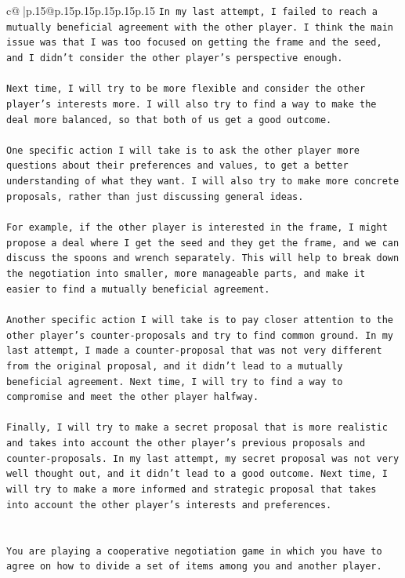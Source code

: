 \documentclass{article}
\begin{document}
{\begin{supertabular}{c@{$\;$}|p{.15\linewidth}@{}p{.15\linewidth}p{.15\linewidth}p{.15\linewidth}p{.15\linewidth}p{.15\linewidth}}
{{{\texttt{In my last attempt, I failed to reach a mutually beneficial agreement with the other player. I think the main issue was that I was too focused on getting the frame and the seed, and I didn't consider the other player's perspective enough. } \\
\\ 
\texttt{Next time, I will try to be more flexible and consider the other player's interests more. I will also try to find a way to make the deal more balanced, so that both of us get a good outcome. } \\
\\ 
\texttt{One specific action I will take is to ask the other player more questions about their preferences and values, to get a better understanding of what they want. I will also try to make more concrete proposals, rather than just discussing general ideas. } \\
\\ 
\texttt{For example, if the other player is interested in the frame, I might propose a deal where I get the seed and they get the frame, and we can discuss the spoons and wrench separately. This will help to break down the negotiation into smaller, more manageable parts, and make it easier to find a mutually beneficial agreement.} \\
\\ 
\texttt{Another specific action I will take is to pay closer attention to the other player's counter{-}proposals and try to find common ground. In my last attempt, I made a counter{-}proposal that was not very different from the original proposal, and it didn't lead to a mutually beneficial agreement. Next time, I will try to find a way to compromise and meet the other player halfway.} \\
\\ 
\texttt{Finally, I will try to make a secret proposal that is more realistic and takes into account the other player's previous proposals and counter{-}proposals. In my last attempt, my secret proposal was not very well thought out, and it didn't lead to a good outcome. Next time, I will try to make a more informed and strategic proposal that takes into account the other player's interests and preferences.} \\
\\ 
\\ 
\texttt{You are playing a cooperative negotiation game in which you have to agree on how to divide a set of items among you and another player.} \\
\\ 
}}}
\end{supertabular}}
\end{document}
